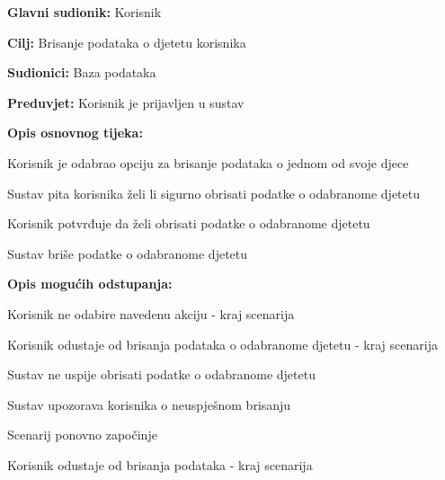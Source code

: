 					\noindent {}
					\begin{packed_item}
	
						\item \textbf{Glavni sudionik: }Korisnik
						\item  \textbf{Cilj:} Brisanje podataka o djetetu korisnika
						\item  \textbf{Sudionici:} Baza podataka
						\item  \textbf{Preduvjet:} Korisnik je prijavljen u sustav
						\item  \textbf{Opis osnovnog tijeka:}
						
						\item[] \begin{packed_enum}
							\item Korisnik je odabrao opciju za brisanje podataka o jednom od svoje djece
							\item Sustav pita korisnika želi li sigurno obrisati podatke o odabranome djetetu
							\item Korisnik potvrđuje da želi obrisati podatke o odabranome djetetu
							\item Sustav briše podatke o odabranome djetetu
						\end{packed_enum}

						\eject

						\item  \textbf{Opis mogućih odstupanja:}

						\item[] \begin{packed_item}
							\item[1.a] Korisnik ne odabire navedenu akciju - kraj scenarija
							\item[3.a] Korisnik odustaje od brisanja podataka o odabranome djetetu - kraj scenarija
							\item[4.a] Sustav ne uspije obrisati podatke o odabranome djetetu
							\item[] \begin{packed_enum}
								\item Sustav upozorava korisnika o neuspješnom brisanju
								\item
									\begin{packed_enum}
										\item Scenarij ponovno započinje
										\item Korisnik odustaje od brisanja podataka - kraj scenarija
									\end{packed_enum}	
							\end{packed_enum}					
						\end{packed_item}
					\end{packed_item}	

